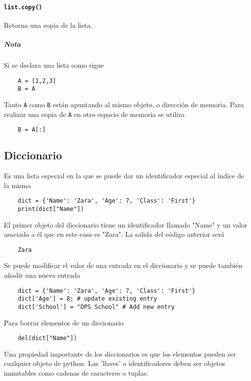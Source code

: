 \paragraph{\texttt{list.copy()}} Retorna una copia de la lista.

\subparagraph{Nota} Si se declara una lista como sigue
\begin{verbatim}
    A = [1,2,3]
    B = A
\end{verbatim}
Tanto \texttt{A} como \texttt{B} están apuntando al mismo objeto, o dirección
de memoria. Para realizar una copia de \texttt{A} en otro espacio de memoria se
utiliza

\begin{verbatim}
    B = A[:]
\end{verbatim}

\subsection{Diccionario}

Es una lista especial en la que se puede dar un identificador especial al
índice de la misma

\begin{verbatim}
    dict = {'Name': 'Zara', 'Age': 7, 'Class': 'First'}
    print(dict["Name"])
\end{verbatim}

El primer objeto del diccionario tiene un identificador llamado "Name" y un
valor asociado a él que en este caso es "Zara". La salida del código anterior
será

\begin{verbatim}
    Zara
\end{verbatim}

Se puede modificar el valor de una entrada en el diccionario y se puede también
añadir una nueva entrada

\begin{verbatim}
    dict = {'Name': 'Zara', 'Age': 7, 'Class': 'First'}
    dict['Age'] = 8; # update existing entry
    dict['School'] = "DPS School" # Add new entry
\end{verbatim}

Para borrar elementos de un diccionario

\begin{verbatim}
    del(dict["Name"])
\end{verbatim}

Una propiedad importante de los diccionarios es que los elementos pueden ser
cualquier objeto de python. Las 'llaves' o identificadores deben ser objetos
inmutables como cadenas de caracteres o tuplas.

